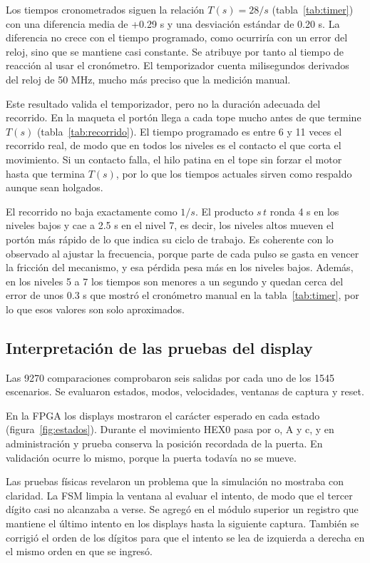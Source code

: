 \documentclass[12pt,letterpaper]{article}
\begin{document}
Los tiempos cronometrados siguen la relación $T(s)=28/s$
(tabla~\ref{tab:timer}) con una diferencia media de
+0.29 s y una desviación estándar de 0.20 s. La diferencia
no crece con el tiempo programado, como ocurriría con un
error del reloj, sino que se mantiene casi constante. Se
atribuye por tanto al tiempo de reacción al usar el
cronómetro. El temporizador cuenta milisegundos derivados
del reloj de 50 MHz, mucho más preciso que la medición
manual.

Este resultado valida el temporizador, pero no la
duración adecuada del recorrido. En la maqueta el portón
llega a cada tope mucho antes de que termine $T(s)$
(tabla~\ref{tab:recorrido}). El tiempo programado es entre
6 y 11 veces el recorrido real, de modo que en todos los
niveles es el contacto el que corta el movimiento. Si un
contacto falla, el hilo patina en el tope sin forzar el
motor hasta que termina $T(s)$, por lo que los tiempos
actuales sirven como respaldo aunque sean holgados.

El recorrido no baja exactamente como $1/s$. El producto
$s\,t$ ronda 4 s en los niveles bajos y cae a 2.5 s en el
nivel 7, es decir, los niveles altos mueven el portón más
rápido de lo que indica su ciclo de trabajo. Es coherente
con lo observado al ajustar la frecuencia, porque parte de
cada pulso se gasta en vencer la fricción del mecanismo, y
esa pérdida pesa más en los niveles bajos. Además, en los
niveles 5 a 7 los tiempos son menores a un segundo y
quedan cerca del error de unos 0.3 s que mostró el
cronómetro manual en la tabla~\ref{tab:timer}, por lo que
esos valores son solo aproximados.

\subsection{Interpretación de las pruebas del display}

Las 9270 comparaciones comprobaron seis salidas por
cada uno de los 1545 escenarios. Se evaluaron estados,
modos, velocidades, ventanas de captura y reset.

En la FPGA los displays mostraron el carácter esperado en
cada estado (figura~\ref{fig:estados}). Durante el
movimiento HEX0 pasa por o, A y c, y en administración y
prueba conserva la posición recordada de la puerta. En
validación ocurre lo mismo, porque la puerta todavía no
se mueve.

Las pruebas físicas revelaron un problema que la
simulación no mostraba con claridad. La FSM limpia la
ventana al evaluar el intento, de modo que el tercer
dígito casi no alcanzaba a verse. Se agregó en el módulo
superior un registro que mantiene el último intento en
los displays hasta la siguiente captura. También se
corrigió el orden de los dígitos para que el intento se
lea de izquierda a derecha en el mismo orden en que se
ingresó.
\end{document}
